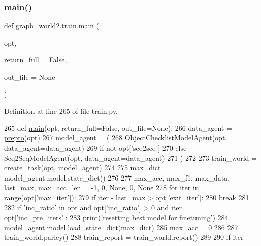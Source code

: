 \subsubsection{\texorpdfstring{main()}{main()}}
{\footnotesize\ttfamily def graph\+\_\+world2.\+train.\+main (\begin{DoxyParamCaption}\item[{}]{opt,  }\item[{}]{return\+\_\+full = {\ttfamily False},  }\item[{}]{out\+\_\+file = {\ttfamily None} }\end{DoxyParamCaption})}



Definition at line 265 of file train.\+py.


\begin{DoxyCode}
265 \textcolor{keyword}{def }\hyperlink{namespacegraph__world2_1_1train_af3dec887619817c1a7a38930ffcfd1cb}{main}(opt, return\_full=False, out\_file=None):
266     data\_agent = \hyperlink{namespacegraph__world2_1_1train_ac238655ccbc748146d1cbaaac96433a5}{prepro}(opt)
267     model\_agent = (
268         ObjectChecklistModelAgent(opt, data\_agent=data\_agent)
269         \textcolor{keywordflow}{if} \textcolor{keywordflow}{not} opt[\textcolor{stringliteral}{'seq2seq'}]
270         \textcolor{keywordflow}{else} Seq2SeqModelAgent(opt, data\_agent=data\_agent)
271     )
272 
273     train\_world = \hyperlink{namespaceparlai_1_1core_1_1worlds_a79969c7ba76d4b3c500f5bb776444dc6}{create\_task}(opt, model\_agent)
274 
275     max\_dict = model\_agent.model.state\_dict()
276 
277     max\_acc, max\_f1, max\_data, last\_max, max\_acc\_len = -1, 0, \textcolor{keywordtype}{None}, 0, \textcolor{keywordtype}{None}
278     \textcolor{keywordflow}{for} iter \textcolor{keywordflow}{in} range(opt[\textcolor{stringliteral}{'max\_iter'}]):
279         \textcolor{keywordflow}{if} iter - last\_max > opt[\textcolor{stringliteral}{'exit\_iter'}]:
280             \textcolor{keywordflow}{break}
281 
282         \textcolor{keywordflow}{if} \textcolor{stringliteral}{'inc\_ratio'} \textcolor{keywordflow}{in} opt \textcolor{keywordflow}{and} opt[\textcolor{stringliteral}{'inc\_ratio'}] > 0 \textcolor{keywordflow}{and} iter == opt[\textcolor{stringliteral}{'inc\_pre\_iters'}]:
283             print(\textcolor{stringliteral}{'resetting best model for finetuning'})
284             model\_agent.model.load\_state\_dict(max\_dict)
285             max\_acc = 0
286 
287         train\_world.parley()
288         train\_report = train\_world.report()
289 
290         \textcolor{keywordflow}{if} iter %

\end{DoxyCode}
